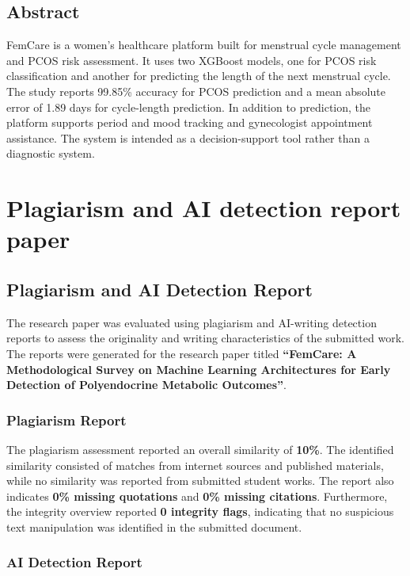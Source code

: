 \subsection*{Abstract}

FemCare is a women's healthcare platform built for menstrual cycle management and PCOS risk assessment. It uses two XGBoost models, one for PCOS risk classification and another for predicting the length of the next menstrual cycle. The study reports 99.85\% accuracy for PCOS prediction and a mean absolute error of 1.89 days for cycle-length prediction. In addition to prediction, the platform supports period and mood tracking and gynecologist appointment assistance. The system is intended as a decision-support tool rather than a diagnostic system.



\section{Plagiarism and AI detection report paper}

\subsection*{Plagiarism and AI Detection Report}

The research paper was evaluated using plagiarism and AI-writing detection reports to assess the originality and writing characteristics of the submitted work. The reports were generated for the research paper titled \textbf{``FemCare: A Methodological Survey on Machine Learning Architectures for Early Detection of Polyendocrine Metabolic Outcomes''}.

\subsubsection*{Plagiarism Report}

The plagiarism assessment reported an overall similarity of \textbf{10\%}. The identified similarity consisted of matches from internet sources and published materials, while no similarity was reported from submitted student works. The report also indicates \textbf{0\% missing quotations} and \textbf{0\% missing citations}. Furthermore, the integrity overview reported \textbf{0 integrity flags}, indicating that no suspicious text manipulation was identified in the submitted document.

\subsubsection*{AI Detection Report}

